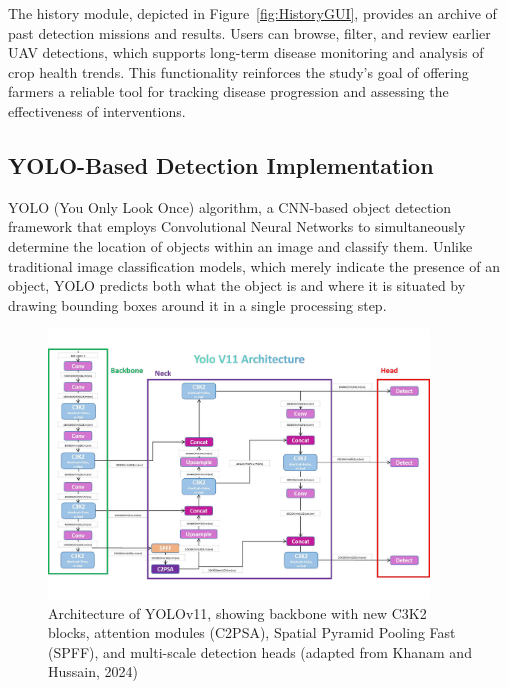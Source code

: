 The history module, depicted in Figure~\ref{fig:HistoryGUI}, provides an archive of past detection missions and results. Users can browse, filter, and review earlier UAV detections, which supports long-term disease monitoring and analysis of crop health trends. This functionality reinforces the study’s goal of offering farmers a reliable tool for tracking disease progression and assessing the effectiveness of interventions.

\subsection{YOLO-Based Detection Implementation}
YOLO (You Only Look Once) algorithm, a CNN-based object detection framework that employs Convolutional Neural Networks to simultaneously determine the location of objects within an image and classify them. Unlike traditional image classification models, which merely indicate the presence of an object, YOLO predicts both what the object is and where it is situated by drawing bounding boxes around it in a single processing step.

\begin{figure}[H]
	\centering
	\caption{Architecture of YOLOv11, showing backbone with new C3K2 blocks, attention modules (C2PSA), Spatial Pyramid Pooling Fast (SPFF), and multi-scale detection heads (adapted from Khanam and Hussain, 2024)}
	\label{fig:yolov11_architecture}
	\includegraphics[width=0.9\textwidth]{figures/yolov11.pdf}
\end{figure}

